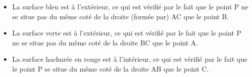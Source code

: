 \documentclass[11pt,a4paper]{report}
\begin{document}
\begin{itemize}
    \item La surface bleu est à l’extérieur, ce qui est vérifié par le fait que le point P ne se situe pas du même coté de la droite (formée par) AC que le point B.
    \item La surface verte est à l’extérieur, ce qui est vérifié par le fait que le point P ne se situe pas du même coté de la droite BC que le point A.
    \item La surface hachurée en rouge est à l'intérieur, ce qui est vérifié par le fait que le point P se situe du même coté de la droite AB que le point C.
\end{itemize}
\end{document}
